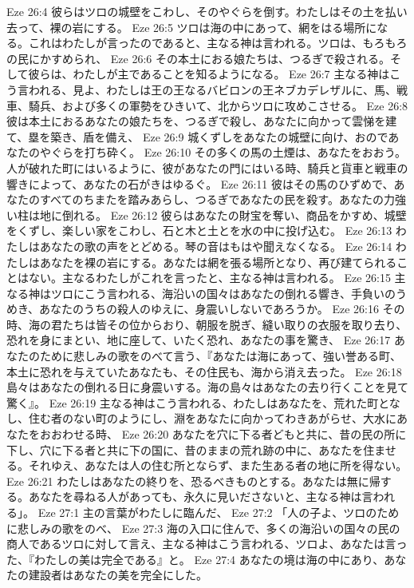 Eze 26:4  彼らはツロの城壁をこわし、そのやぐらを倒す。わたしはその土を払い去って、裸の岩にする。
Eze 26:5  ツロは海の中にあって、網をはる場所になる。これはわたしが言ったのであると、主なる神は言われる。ツロは、もろもろの民にかすめられ、
Eze 26:6  その本土におる娘たちは、つるぎで殺される。そして彼らは、わたしが主であることを知るようになる。
Eze 26:7  主なる神はこう言われる、見よ、わたしは王の王なるバビロンの王ネブカデレザルに、馬、戦車、騎兵、および多くの軍勢をひきいて、北からツロに攻めこさせる。
Eze 26:8  彼は本土におるあなたの娘たちを、つるぎで殺し、あなたに向かって雲悌を建て、塁を築き、盾を備え、
Eze 26:9  城くずしをあなたの城壁に向け、おのであなたのやぐらを打ち砕く。
Eze 26:10  その多くの馬の土煙は、あなたをおおう。人が破れた町にはいるように、彼があなたの門にはいる時、騎兵と貨車と戦車の響きによって、あなたの石がきはゆるぐ。
Eze 26:11  彼はその馬のひずめで、あなたのすべてのちまたを踏みあらし、つるぎであなたの民を殺す。あなたの力強い柱は地に倒れる。
Eze 26:12  彼らはあなたの財宝を奪い、商品をかすめ、城壁をくずし、楽しい家をこわし、石と木と土とを水の中に投げ込む。
Eze 26:13  わたしはあなたの歌の声をとどめる。琴の音はもはや聞えなくなる。
Eze 26:14  わたしはあなたを裸の岩にする。あなたは網を張る場所となり、再び建てられることはない。主なるわたしがこれを言ったと、主なる神は言われる。
Eze 26:15  主なる神はツロにこう言われる、海沿いの国々はあなたの倒れる響き、手負いのうめき、あなたのうちの殺人のゆえに、身震いしないであろうか。
Eze 26:16  その時、海の君たちは皆その位からおり、朝服を脱ぎ、縫い取りの衣服を取り去り、恐れを身にまとい、地に座して、いたく恐れ、あなたの事を驚き、
Eze 26:17  あなたのために悲しみの歌をのべて言う、『あなたは海にあって、強い誉ある町、本土に恐れを与えていたあなたも、その住民も、海から消え去った。
Eze 26:18  島々はあなたの倒れる日に身震いする。海の島々はあなたの去り行くことを見て驚く』。
Eze 26:19  主なる神はこう言われる、わたしはあなたを、荒れた町となし、住む者のない町のようにし、淵をあなたに向かってわきあがらせ、大水にあなたをおおわせる時、
Eze 26:20  あなたを穴に下る者どもと共に、昔の民の所に下し、穴に下る者と共に下の国に、昔のままの荒れ跡の中に、あなたを住ませる。それゆえ、あなたは人の住む所とならず、また生ある者の地に所を得ない。
Eze 26:21  わたしはあなたの終りを、恐るべきものとする。あなたは無に帰する。あなたを尋ねる人があっても、永久に見いださないと、主なる神は言われる」。
Eze 27:1  主の言葉がわたしに臨んだ、
Eze 27:2  「人の子よ、ツロのために悲しみの歌をのべ、
Eze 27:3  海の入口に住んで、多くの海沿いの国々の民の商人であるツロに対して言え、主なる神はこう言われる、ツロよ、あなたは言った、『わたしの美は完全である』と。
Eze 27:4  あなたの境は海の中にあり、あなたの建設者はあなたの美を完全にした。
